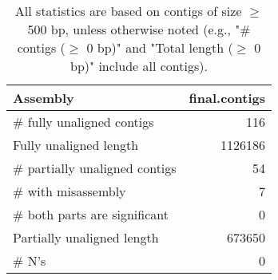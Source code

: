 \documentclass[12pt,a4paper]{article}
\begin{document}
\begin{table}[ht]
\begin{center}
\caption{All statistics are based on contigs of size $\geq$ 500 bp, unless otherwise noted (e.g., "\# contigs ($\geq$ 0 bp)" and "Total length ($\geq$ 0 bp)" include all contigs).}
\begin{tabular}{|l*{1}{|r}|}
\hline
Assembly & final.contigs \\ \hline
\# fully unaligned contigs & 116 \\ \hline
Fully unaligned length & 1126186 \\ \hline
\# partially unaligned contigs & 54 \\ \hline
\hspace{5mm}\# with misassembly & 7 \\ \hline
\hspace{5mm}\# both parts are significant & 0 \\ \hline
Partially unaligned length & 673650 \\ \hline
\# N's & 0 \\ \hline
\end{tabular}
\end{center}
\end{table}
\end{document}
